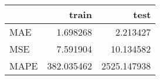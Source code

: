 \begin{tabular}{lrr}
\toprule
{} &       train &         test \\
\midrule
MAE  &    1.698268 &     2.213427 \\
MSE  &    7.591904 &    10.134582 \\
MAPE &  382.035462 &  2525.147938 \\
\bottomrule
\end{tabular}
